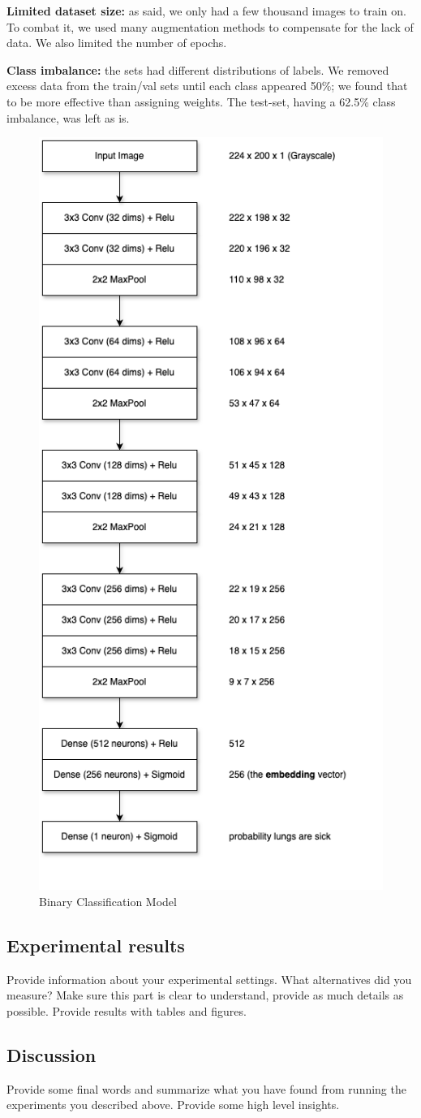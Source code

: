 \documentclass{article}
\begin{document}
\textbf{Limited dataset size:} as said, we only had a few thousand images to train on.
To combat it, we used many augmentation methods to compensate for the lack of data. We also limited the number of epochs.

\textbf{Class imbalance:} the sets had different distributions of labels.
We removed excess data from the train/val sets until each class appeared 50\%; we found that to be more effective than assigning weights. The test-set, having a 62.5\% class imbalance, was left as is.

\begin{figure}
  \centering
  \includegraphics[width=0.45\linewidth, angle=90]{model_1.png}
  \caption{Binary Classification Model}
  \label{fig:model_1}
\end{figure}

\subsection{Experimental results}
Provide information about your experimental settings. What alternatives did you measure? Make sure this part is clear to understand, provide as much details as possible. Provide results with tables and figures.

\subsection{Discussion}
Provide some final words and summarize what you have found from running the experiments you described above. Provide some high level insights.
\end{document}
